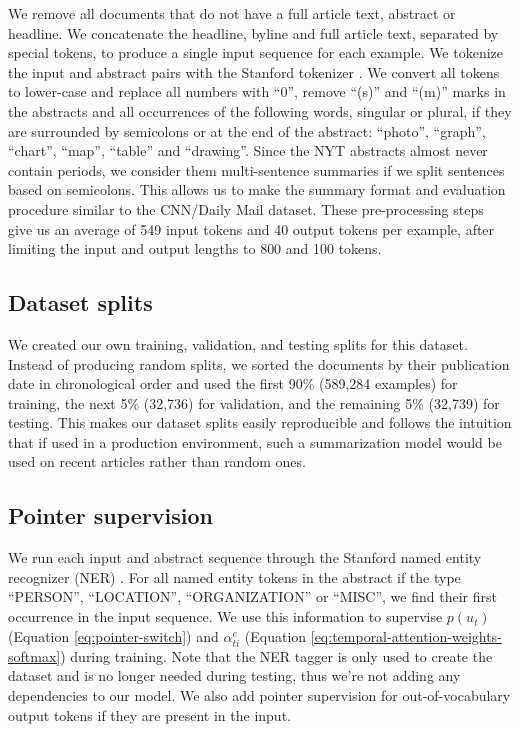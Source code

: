 \documentclass{article} \usepackage{iclr2018_arxiv,times}
\begin{document}
We remove all documents that do not have a full article text, abstract or headline. We concatenate the headline, byline and full article text, separated by special tokens, to produce a single input sequence for each example. We tokenize the input and abstract pairs with the Stanford tokenizer \citep{manning2014}. We convert all tokens to lower-case and replace all numbers with ``0'', remove ``(s)'' and ``(m)'' marks in the abstracts and all occurrences of the following words, singular or plural, if they are surrounded by semicolons or at the end of the abstract: ``photo'', ``graph'', ``chart'', ``map'', ``table'' and ``drawing''. Since the NYT abstracts almost never contain periods, we consider them multi-sentence summaries if we split sentences based on semicolons. This allows us to make the summary format and evaluation procedure similar to the CNN/Daily Mail dataset. These pre-processing steps give us an average of 549 input tokens and 40 output tokens per example, after limiting the input and output lengths to 800 and 100 tokens.

\subsection{Dataset splits}
We created our own training, validation, and testing splits for this dataset. Instead of producing random splits, we sorted the documents by their publication date in chronological order and used the first 90\% (589,284 examples) for training, the next 5\% (32,736) for validation, and the remaining 5\% (32,739) for testing. This makes our dataset splits easily reproducible and follows the intuition that if used in a production environment, such a summarization model would be used on recent articles rather than random ones.

\subsection{Pointer supervision}
\label{section:nyt-pointer-supervision}

We run each input and abstract sequence through the Stanford named entity recognizer (NER) \citep{manning2014}. For all named entity tokens in the abstract if the type ``PERSON'', ``LOCATION'', ``ORGANIZATION'' or ``MISC'', we find their first occurrence in the input sequence. We use this information to supervise $p(u_t)$ (Equation \ref{eq:pointer-switch}) and $\alpha^e_{ti}$ (Equation \ref{eq:temporal-attention-weights-softmax}) during training. Note that the NER tagger is only used to create the dataset and is no longer needed during testing, thus we're not adding any dependencies to our model. We also add pointer supervision for out-of-vocabulary output tokens if they are present in the input.
\end{document}
